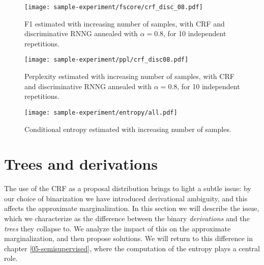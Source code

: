 
    \begin{figure}[h]
      \center
    	\texttt{[image: sample-experiment/fscore/crf\_disc\_08.pdf]}
      \caption{F1 estimated with increasing number of samples, with CRF and discriminative RNNG annealed with $\alpha=0.8$, for 10 independent repetitions.}
      \label{fig:samples-fscores-crf}
    \end{figure}

    \begin{figure}[h]
      \center
    	\texttt{[image: sample-experiment/ppl/crf\_disc08.pdf]}
      \caption{Perplexity estimated with increasing number of samples, with CRF and discriminative RNNG annealed with $\alpha=0.8$, for 10 independent repetitions.}
      \label{fig:samples-perplexities-crf}

      \texttt{[image: sample-experiment/entropy/all.pdf]}
      \caption{Conditional entropy estimated with increasing number of samples.}
      \label{fig:samples-entropy-crf}
    \end{figure}
    \restoregeometry

\section{Trees and derivations}
  The use of the CRF as a proposal distribution brings to light a subtle issue: by our choice of binarization we have introduced derivational ambiguity, and this affects the approximate marginalization. In this section we will describe the issue, which we characterize as the difference between the binary \textit{derivations} and the \textit{trees} they collapse to. We analyze the impact of this on the approximate marginalization, and then propose solutions. We will return to this difference in chapter \ref{05-semisupervised}, where the computation of the entropy plays a central role.


